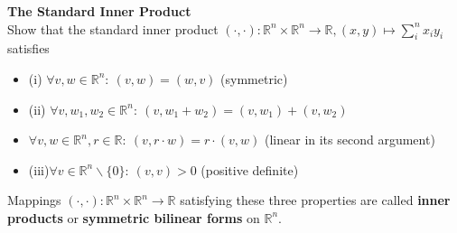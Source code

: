 \textbf{The Standard Inner Product}\\
Show that the standard inner product $(\cdot,\cdot)\colon \mathbb{R}^n\times \mathbb{R}^n \to \mathbb{R}, (x,y) \mapsto \sum_i^n x_i y_i$ satisfies
\begin{itemize}
    \item(i) $\forall v,w \in \mathbb{R}^n: ~(v,w) = (w,v)$ (symmetric)
    \item(ii) $\forall v,w_1,w_2 \in \mathbb{R}^n: ~(v,w_1+w_2) = (v,w_1)+(v,w_2)$
    \item $\forall v,w \in \mathbb{R}^n, r \in \mathbb{R}: ~ (v,r\cdot w)=r\cdot(v,w)$ (linear in its second argument)
    \item (iii)$\forall v \in \mathbb{R}^n\backslash\{0\}: ~ (v,v) > 0$ (positive definite)
\end{itemize}

Mappings $(\cdot,\cdot)\colon \mathbb{R}^n\times \mathbb{R}^n \to \mathbb{R}$ satisfying these three properties are called \textbf{inner products} or \textbf{symmetric bilinear forms} on $\mathbb{R}^n$.
